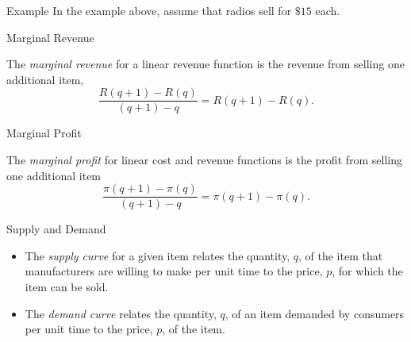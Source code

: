 \documentclass[Lecture.tex]{subfiles}
\begin{document}
\begin{frame}{Example}
  In the example above, assume that radios sell for $\$15$ each.
\end{frame}

\begin{frame}{Marginal Revenue}
  \begin{defn}
    The {\it marginal revenue} for a linear revenue function is the revenue from selling one additional item,
    $$\frac{R(q + 1) - R(q)}{(q + 1) - q} = R(q + 1) - R(q).$$
  \end{defn}
\end{frame}
    
\begin{frame}{Marginal Profit}
  \begin{defn}
    The {\it marginal profit} for linear cost and revenue functions is the profit from selling one additional item
    $$\frac{\pi(q+1) - \pi(q)}{(q + 1) - q} = \pi(q + 1) - \pi(q).$$
  \end{defn}
  
\end{frame}

\begin{frame}{Supply and Demand}
	\begin{defn}
	\begin{itemize}
	\item<1->
	The {\it supply curve} for a given item relates the quantity, $q$, of the item that manufacturers are willing to make per unit time to the price, $p$, for which the item can be sold.
	\item<2->
	The {\it demand curve} relates the quantity, $q$, of an item demanded by consumers per unit time to the price, $p$, of the item.
	\end{itemize}
	\end{defn}
\end{frame}
\end{document}
